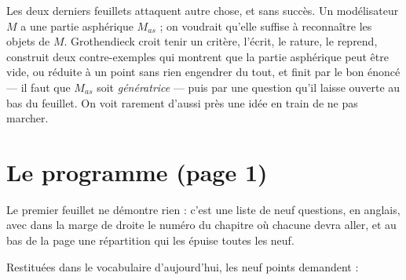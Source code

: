 \documentclass[11pt,a4paper]{article}
\begin{document}
\begin{resume}
Les deux derniers feuillets attaquent autre chose, et sans succès. Un
modélisateur $M$ a une partie asphérique $M_{as}$ ; on voudrait qu'elle suffise
à reconnaître les objets de $M$. Grothendieck croit tenir un critère, l'écrit,
le rature, le reprend, construit deux contre-exemples qui montrent que la partie
asphérique peut être vide, ou réduite à un point sans rien engendrer du tout, et
finit par le bon énoncé — il faut que $M_{as}$ soit \emph{génératrice} — puis par
une question qu'il laisse ouverte au bas du feuillet. On voit rarement d'aussi
près une idée en train de ne pas marcher.

\end{resume}

\section*{Le programme (page 1)}

Le premier feuillet ne démontre rien : c'est une liste de neuf questions, en
anglais, avec dans la marge de droite le numéro du chapitre où chacune devra
aller, et au bas de la page une répartition qui les épuise toutes les neuf.

Restituées dans le vocabulaire d'aujourd'hui, les neuf points demandent :
\end{document}
